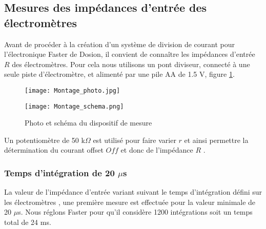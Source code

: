 \documentclass[a4paper,11pt]{article}
\begin{document}
\setmarginsrb{3.5cm}{1.5cm}{1.5cm}{2cm}{2ex}{3ex}{2ex}{5ex}
%
\lhead[]{}
\fancyfoot[C]{}
\fancyfoot[R]{\thepage}

\begin{center}
\subsection*{Mesures des impédances d'entrée des électromètres}
\end{center}

Avant de procéder à la création d'un système de division de courant pour l'électronique Faster de Dosion, il convient de connaître les impédances d'entrée $R$ des électromètres.
Pour cela nous utilisons un pont diviseur, connecté à une seule piste d'électromètre, et alimenté par une pile AA de 1.5 V, figure \ref{fig:manip}.

\begin{figure}[h]
\begin{center}
\begin{minipage}[c]{0.48\linewidth}
\texttt{[image: Montage\_photo.jpg]} 
\end{minipage}
\hfill
\begin{minipage}[c]{0.48\linewidth}
\texttt{[image: Montage\_schema.png]} 
\end{minipage}
\caption{\label{fig:manip}\footnotesize{Photo et schéma du dispositif de mesure}}
\end{center}
\end{figure}
Un potentiomètre de 50 k$\Omega$ est utilisé pour faire varier $r$ et ainsi permettre la détermination du courant offset $Off$ et donc de l'impédance $R$ .

\subsubsection*{Temps d'intégration de 20 $\mu$s}
La valeur de l'impédance d'entrée variant suivant le temps d'intégration défini sur les électromètres , une première mesure est effectuée pour la valeur minimale de 20 $\mu$s. Nous réglons Faster pour qu'il considère 1200 intégrations soit un temps total de 24 ms.
\end{document}
